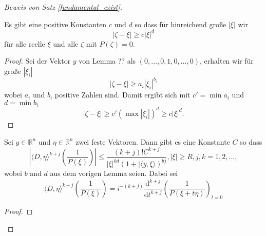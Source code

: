 \begin{proof}[Beweis von Satz \ref{fundamental_exist}]
\begin{lem}
Es gibt eine positive Konstanten $c$ und $d$ so dass für hinreichend große $|\xi|$ wir 
\begin{equation}
|\zeta- \xi|\ge c |\xi|^{d}
\end{equation} 
für alle reelle $\xi$ und alle $\zeta$ mit $P(\zeta)=0$.
\end{lem} 
\begin{proof}
Sei der Vektor $y$ von Lemma ?? als $(0,\ldots, 0, 1, 0, \ldots, 0)$, erhalten wir für große $|\xi_i|$
\begin{equation}
|\zeta-\xi|\ge a_i |\xi_i|^{b_i}
\end{equation}
wobei $a_i$ und $b_i$ positive Zahlen sind. Damit ergibt sich mit $c'=\min a_i$ und $d=\min b_i$ 
\begin{equation}
|\zeta - \xi|\ge c'(\max |\xi_i|)^d \ge c |\xi|^d.
\end{equation}
\end{proof}
\begin{lem}
Sei $y\in \mathbb R^n$ und $\eta \in \mathbb R^n$ zwei feste Vektoren. Dann gibt es eine Konstante $C$ so dass
\begin{equation}
\left | \langle D, \eta \rangle^{k+j} \left ( \frac{1}{P(\xi)} \right )  \right | \le \frac{(k+j)! C^{k+j}}{|\xi|^{kd} ( 1+ |\langle y,\xi\rangle )^{bj}}, |\xi|\ge R, j, k=1,2,\ldots,
\end{equation}
wobei $b$ and $d$ aus dem vorigen Lemma seien. Dabei sei
\begin{equation}
\langle D, \eta\rangle^{k+j} \left (\frac{1}{P(\xi)} \right ) = i^{-(k+j)} \frac{\mathrm d^{k+j}}{\mathrm d t^{k+j}} \left ( \frac{1}{P(\xi+ t\eta)} \right )_{t=0}
\end{equation}
\end{lem}
\begin{proof}

\end{proof}
\end{proof}
